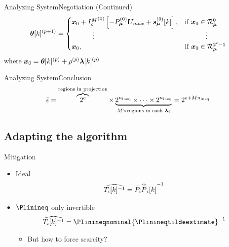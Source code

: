 \documentclass[aspectratio=169]{beamer}
\begin{document}
\begin{frame}{Analyzing System}{Negotiation (Continued)}
  \centering
  \begin{equation*}
    \begin{aligned}
      \vec{\theta}[k]\pplusone=
      \begin{cases}
        \vec{x}_{0}+
        {I_{c}^{M}}^{(0)}\left[-P_{\vec{\mu}}^{(0)}\vec{U}_{max}+\vec{s}_{\vec{\mu}}^{(0)}[k]\right],&\text{if}\ \vec{x}_{0}\in\set{R}_{\vec{\mu}}^{0}\\
        \qquad\quad \vdots&\qquad\quad \vdots\\
        \vec{x}_{0},&\text{if}\ \vec{x}_{0}\in\set{R}_{\vec{\mu}}^{2^{c}-1}
      \end{cases}
    \end{aligned}
  \end{equation*}
  where $\boldsymbol{x}_{0}=\boldsymbol{\theta}[k]^{(p)}+\rho^{(p)}\boldsymbol{\lambda}[k]^{(p)}$
\end{frame}

\begin{frame}{Analyzing System}{Conclusion}
  \begin{equation*}
    \bar{\epsilon}=\overbrace{2^{c}}^{\text{regions in projection}}\times \underbrace{2^{n_{\text{ineq}}}\times \dots \times 2^{{n_{\text{ineq}}}}}_{M\times \text{regions in each }\boldsymbol{\lambda}_{i} }=2^{c+Mn_{\text{ineq}}}
  \end{equation*}
\end{frame}

\subsection{Adapting the algorithm}

\begin{frame}{Mitigation}
  \begin{itemize}
    \item<2-> Ideal
          \begin{equation*}
            {\widehat{T_{i}[k]^{-1}}=\bar{{P}}_{i}{\widehat{\tilde{P}}_{i}[k]}^{-1}}
          \end{equation*}
    \item<3-> $\Plinineq$ only invertible
          \begin{equation*}
            {\Tikinvestimate=\Plinineqnominal{\Plinineqtildeestimate}^{-1}}
          \end{equation*}
          \begin{itemize}
            \item<4-> But how to force scarcity? 
          \end{itemize}
  \end{itemize}
\end{frame}
\end{document}
